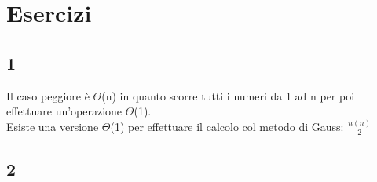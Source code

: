 \documentclass{report}
\newcommand{\T}[1]{$\Theta$(#1)}
\begin{document}
\section{Esercizi}
    \subsection{1}
        Il caso peggiore è \T{n} in quanto scorre tutti i numeri da 1 ad n per poi effettuare 
        un'operazione \T{1}. \\
        Esiste una versione \T{1} per effettuare il calcolo col metodo di Gauss: $\frac{n\left(n\right)}{2}$
    \subsection{2}
        
        
\end{document}
